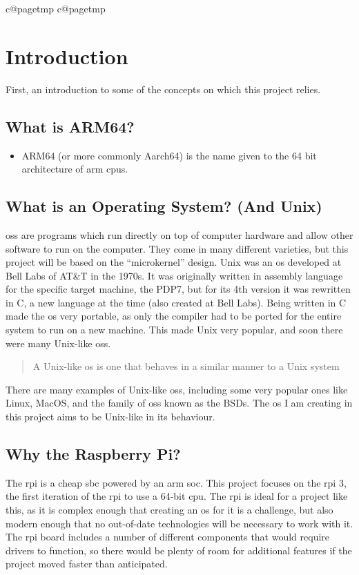 \documentclass{article}
\makeatletter
\newcommand{\mypagenumbering}[1]{%
    \ifcsname c@pagetmp\endcsname
    \else
        \newcounter{pagetmp}
    \fi
    \setcounter{pagetmp}{\value{page}}
    \pagenumbering{#1}
    \setcounter{page}{\value{pagetmp}}
}
\makeatother
\begin{document}
{\mypagenumbering{roman}\hypersetup{hidelinks} \tableofcontents}
\clearpage
\mypagenumbering{arabic}

\section{Introduction}


First, an introduction to some of the concepts on which this project relies.

\subsection{What is ARM64?}
\begin{itemize}
    \item ARM64 (or more commonly Aarch64) is the name given to the 64 bit
        architecture of \gls{arm} \glspl{cpu}.
\end{itemize}
\subsection{What is an Operating System? (And Unix)}
\glspl{os} are programs which run directly on top of computer hardware and
allow other software to run on the computer. They come in many different
varieties, but this project will be based on the ``microkernel'' design. Unix
was an \gls{os} developed at Bell Labs of AT\&T in the 1970s. It was originally
written in assembly language for the specific target machine, the PDP7, but for
its 4th version it was rewritten in C, a new language at the time (also created
at Bell Labs). Being written in C made the \gls{os} very portable, as only the
compiler had to be ported for the entire system to run on a new machine. This
made Unix very popular, and soon there were many Unix-like \glspl{os}.
\blockquote[\cite{unix-like}]{A Unix-like \gls{os} is one that behaves in a
similar manner to a Unix system}.
There are many examples of Unix-like \glspl{os}, including some very popular
ones like Linux, MacOS, and the family of \glspl{os} known as the BSDs. The
\gls{os} I am creating in this project aims to be Unix-like in its behaviour.

\subsection{Why the Raspberry Pi?}
The \gls{rpi} is a cheap \gls{sbc} powered by an \gls{arm} \gls{soc}. This
project focuses on the \gls{rpi} 3, the first iteration of the \gls{rpi} to use
a 64-bit \gls{cpu}. The \gls{rpi} is ideal for a project like this, as it is
complex enough that creating an \gls{os} for it is a challenge, but also modern
enough that no out-of-date technologies will be necessary to work with it. The
\gls{rpi} board includes a number of different components that would require
drivers to function, so there would be plenty of room for additional features
if the project moved faster than anticipated.
\end{document}
